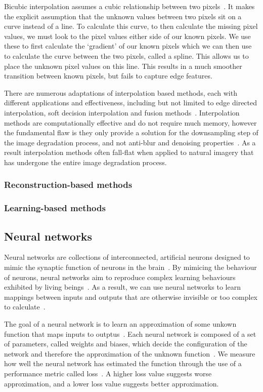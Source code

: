 Bicubic interpolation assumes a cubic relationship between two pixels~\cite{bicubicInterpolation}. It makes the explicit assumption that the unknown values between two pixels sit on a curve instead of a line. To calculate this curve, to then calculate the missing pixel values, we must look to the pixel values either side of our known pixels. We use these to first calculate the `gradient' of our known pixels which we can then use to calculate the curve between the two pixels, called a spline. This allows us to place the unknown pixel values on this line. This results in a much smoother transition between known pixels, but fails to capture edge features.

There are numerous adaptations of interpolation based methods, each with different applications and effectiveness, including but not limited to edge directed interpolation, soft decision interpolation and fusion methods~\cite{interpolation}. Interpolation methods are computationally effective and do not require much memory, however the fundamental flaw is they only provide a solution for the downsampling step of the image degradation process, and not anti-blur and denoising properties~\cite{interpolation}. As a result interpolation methods often fall-flat when applied to natural imagery that has undergone the entire image degradation process. 

\subsubsection{Reconstruction-based methods}

\subsubsection{Learning-based methods}

\subsection{Neural networks}\label{subsec:neural_networks}
Neural networks are collections of interconnected, artificial neurons designed to mimic the synaptic function of neurons in the brain~\cite{ref}. By mimicing the behaviour of neurons, neural networks aim to reproduce complex learning behaviours exhibited by living beings~\cite{ref}. As a result, we can use neural networks to learn mappings between inputs and outputs that are otherwise invisible or too complex to calculate~\cite{ref}.

The goal of a neural network is to learn an approximation of some unkown function that maps inputs to outptus~\cite{ref}. Each neural network is composed of a set of parameters, called weights and biases, which decide the configuration of the network and therefore the approximation of the unknown function~\cite{ref}. We measure how well the neural network has estimated the function through the use of a performance metric called loss~\cite{ref}. A higher loss value suggests worse approximation, and a lower loss value suggests better approximation.

